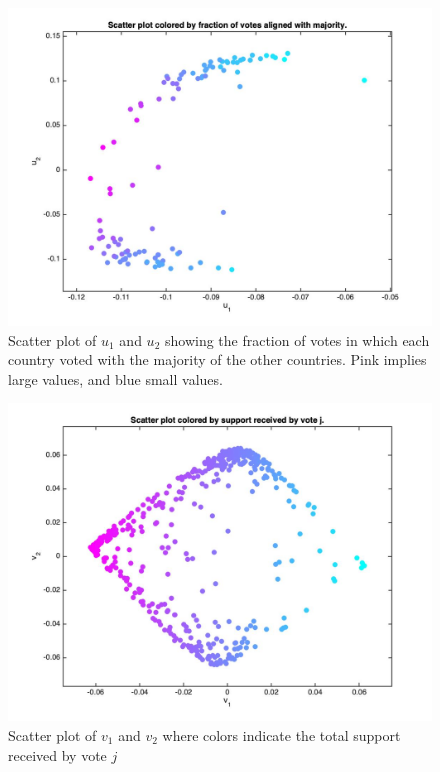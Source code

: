 \documentclass[12pt]{exam}
\begin{document}
\begin{questions}
  \begin{figure}[hpb!]
    \centering
    \includegraphics[scale=0.3]{final_data/country_majority_scatter_plot.jpg}
    \caption{Scatter plot of $u_1$ and $u_2$ showing the fraction of votes in which each country voted with the majority of the other countries. Pink implies large values, and blue small values.}
    \label{fig:scatter_plot_country_majority}
  \end{figure}

  \begin{figure}[hpb!]
    \centering
    \includegraphics[scale=0.3]{final_data/votes_by_total_support.jpg}
    \caption{Scatter plot of $v_1$ and $v_2$ where colors indicate the total support received by vote $j$}
    \label{fig:scatter_plot_votes_by_total_support}
  \end{figure}


\end{questions}
\end{document}
